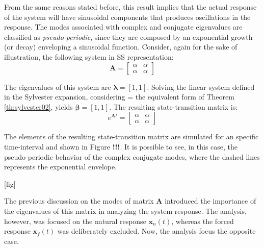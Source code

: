 \documentclass[a4paper,11pt]{book}
\numberwithin{figure}{chapter}
\numberwithin{equation}{chapter}
\numberwithin{table}{chapter}
\theoremstyle{definition}
\begin{document}
From the same reasons stated before, this result implies that the actual response of the system will have sinusoidal components that produces oscillations in the response. The modes associated with complex and conjugate eigenvalues are classified as \textit{pseudo-periodic}, since they are composed by an exponential growth (or decay) enveloping a sinusoidal function. Consider, again for the sake of illustration, the following system in SS representation:
\begin{equation}
    \bm{A} = \begin{bmatrix} 
        \alpha & \alpha \\
        \alpha & \alpha
    \end{bmatrix}
\end{equation}

The eigenvalues of this system are $\bm{\lambda} = [1, 1]$. Solving the linear system defined in the Sylvester expansion, considering = the equivalent form of Theorem \ref{th:sylvester02}, yields $\bm{\beta} = [1, 1]$. The resulting state-transition matrix is: 
\begin{equation}
    e^{\bm{A} t} = \begin{bmatrix} 
        \alpha & \alpha \\
        \alpha & \alpha
    \end{bmatrix}
\end{equation}

The elements of the resulting state-transition matrix are simulated for an specific time-interval and shown in Figure \textbf{!!!}. It is possible to see, in this case, the pseudo-periodic behavior of the complex conjugate modes, where the dashed lines represents the exponential envelope. 

[fig]

The previous discussion on the modes of matrix $\bm{A}$ introduced the importance of the eigenvalues of this matrix in analyzing the system response. The analysis, however, was focused on the natural response $\bm{x}_n(t)$, whereas the forced response $\bm{x}_f(t)$ was deliberately excluded. Now, the analysis focus the opposite case.  
\end{document}

